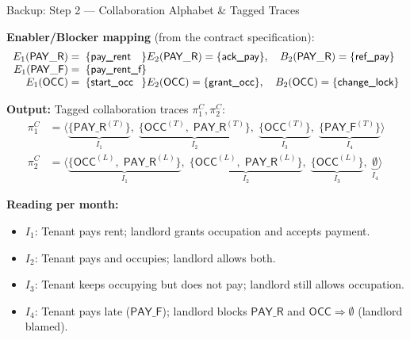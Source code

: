 \documentclass[9pt,aspectratio=169]{beamer}
\newcommand{\PAY}{\ensuremath{\mathsf{PAY\_R}}\xspace}
\newcommand{\PAYF}{\ensuremath{\mathsf{PAY\_F}}\xspace}
\newcommand{\OCC}{\ensuremath{\mathsf{OCC}}\xspace}
\begin{document}
\begin{frame}{Backup: Step 2 — Collaboration Alphabet \& Tagged Traces}
\small

\textbf{Enabler/Blocker mapping} (from the contract specification):
\begingroup\footnotesize
\[
\begin{array}{r@{\;=\;\{}l@{\}}l}
E_1(\PAY) & \textsf{pay\_rent}   & E_2(\PAY) = \{\textsf{ack\_pay}\},\quad B_2(\PAY) = \{\textsf{ref\_pay}\}\\
E_1(\PAYF) & \textsf{pay\_rent\_f} & \\
E_1(\OCC) & \textsf{start\_occ}  & E_2(\OCC) = \{\textsf{grant\_occ}\},\quad B_2(\OCC) = \{\textsf{change\_lock}\}
\end{array}
\]
\endgroup

\begin{center}
\end{center}

\textbf{Output:} Tagged collaboration traces $\pi_1^C, \pi_2^C$:
\begingroup\footnotesize
\[
\begin{aligned}
\pi_1^C &= \langle
  \underbrace{\{\PAY^{(T)}\}}_{I_1},\;
  \underbrace{\{\OCC^{(T)},\;\PAY^{(T)}\}}_{I_2},\;
  \underbrace{\{\OCC^{(T)}\}}_{I_3},\;
  \underbrace{\{\PAYF^{(T)}\}}_{I_4}
\rangle\\[3pt]
\pi_2^C &= \langle
  \underbrace{\{\OCC^{(L)},\;\PAY^{(L)}\}}_{I_1},\;
  \underbrace{\{\OCC^{(L)},\;\PAY^{(L)}\}}_{I_2},\;
  \underbrace{\{\OCC^{(L)}\}}_{I_3},\;
  \underbrace{\emptyset}_{I_4}
\rangle
\end{aligned}
\]
\endgroup

\vspace{1mm}
\textbf{Reading per month:}
\begin{itemize}\setlength\itemsep{1pt}
  \item $I_1$: Tenant pays rent; landlord grants occupation and accepts payment.
  \item $I_2$: Tenant pays and occupies; landlord allows both.
  \item $I_3$: Tenant keeps occupying but does not pay; landlord still allows occupation.
  \item $I_4$: Tenant pays late (\PAYF); \textcolor{ConflictRed}{landlord blocks \PAY and \OCC $\Rightarrow \emptyset$ (landlord blamed)}.
\end{itemize}
\end{frame}
\end{document}
